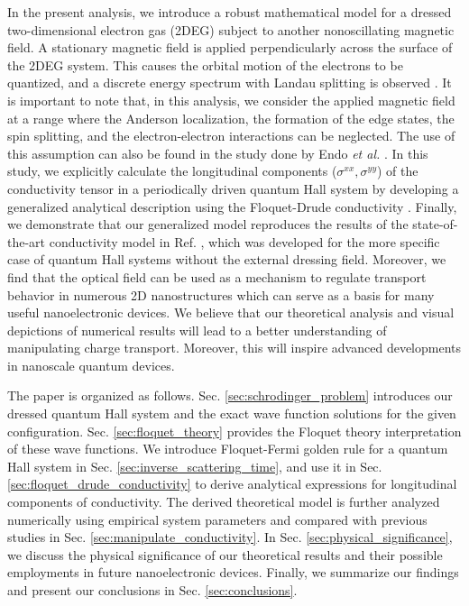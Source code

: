 \documentclass[
 reprint,
 amsmath,amssymb,
 aps,
 prb,
]{revtex4-2}
\begin{document}
In the present analysis, we introduce a robust mathematical model for a dressed two-dimensional electron gas (2DEG) subject to another nonoscillating magnetic field.
A stationary magnetic field is applied perpendicularly across the surface of the 2DEG system. This causes the orbital motion of the electrons to be quantized, and a discrete energy spectrum with Landau splitting is observed \cite{landau30}.
{\color{Red}
It is important to note that, in this analysis, we consider the applied magnetic field at a range where the Anderson localization, the formation of the edge states, the spin splitting, and the electron-electron interactions can be neglected. The use of this assumption can also be found in the study done by Endo \textit{et al.} \cite{endo09}.
} In this study, we explicitly calculate the longitudinal components ($\sigma^{xx},\sigma^{yy}$) of the conductivity tensor in a periodically driven quantum Hall system by developing a generalized analytical description using the Floquet-Drude conductivity \cite{wackerl20}.
Finally, we demonstrate that our generalized model reproduces the results of the state-of-the-art conductivity model in Ref. \cite{endo09}, which was developed for the more specific case of quantum Hall systems without the external dressing field.
Moreover, we find that the optical field can be used as a mechanism to regulate transport behavior in numerous 2D nanostructures which can serve as a basis for many useful nanoelectronic devices. We believe that our theoretical analysis and visual depictions of numerical results will lead to a better understanding of manipulating charge transport. Moreover, this will inspire advanced  developments in nanoscale quantum devices.

The paper is organized as follows. Sec.  \ref{sec:schrodinger_problem} introduces our dressed quantum Hall system and the exact wave function solutions for the given configuration. Sec. \ref{sec:floquet_theory} provides the Floquet theory interpretation of these wave functions.
We introduce Floquet-Fermi golden rule for a quantum Hall system in Sec. \ref{sec:inverse_scattering_time}, and use it in Sec. \ref{sec:floquet_drude_conductivity} to derive analytical expressions for longitudinal components of conductivity.
The derived theoretical model is further analyzed numerically using empirical system parameters and compared with previous studies in Sec. \ref{sec:manipulate_conductivity}. {\color{Red}In Sec. \ref{sec:physical_significance}, we discuss the physical significance of our theoretical results and their possible employments in future nanoelectronic devices.
Finally, we summarize our findings and present our conclusions in Sec. \ref{sec:conclusions}.}
\end{document}
